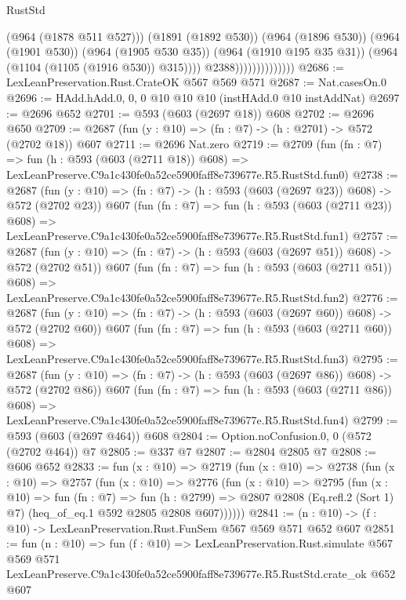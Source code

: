 \begin{lexlean}{RustStd}
\begin{coremodule}
                                      (@964 (@1878 @511 @527)))
                                    (@1891 (@1892 @530))
                                    (@964 (@1896 @530))
                                    (@964 (@1901 @530))
                                    (@964 (@1905 @530 @35))
                                    (@964 (@1910 @195 @35 @31))
                                    (@964 (@1104 (@1105 (@1916 @530)) @315))))
                                @2388))))))))))))))
@2686 := LexLeanPreservation.Rust.CrateOK @567 @569 @571
@2687 := Nat.casesOn.{0}
@2696 := HAdd.hAdd.{0, 0, 0} @10 @10 @10 (instHAdd.{0} @10 instAddNat)
@2697 := @2696 @652
@2701 := @593 (@603 (@2697 @18)) @608
@2702 := @2696 @650
@2709 := @2687 (fun (y : @10) => (fn : @7) -> (h : @2701) -> @572 (@2702 @18)) @607
@2711 := @2696 Nat.zero
@2719 := @2709
    (fun (fn : @7) =>
    fun (h : @593 (@603 (@2711 @18)) @608) =>
    LexLeanPreserve.C9a1c430fe0a52ce5900faff8e739677e.R5.RustStd.fun0)
@2738 := @2687
    (fun (y : @10) => (fn : @7) -> (h : @593 (@603 (@2697 @23)) @608) -> @572 (@2702 @23))
    @607
    (fun (fn : @7) =>
    fun (h : @593 (@603 (@2711 @23)) @608) =>
    LexLeanPreserve.C9a1c430fe0a52ce5900faff8e739677e.R5.RustStd.fun1)
@2757 := @2687
    (fun (y : @10) => (fn : @7) -> (h : @593 (@603 (@2697 @51)) @608) -> @572 (@2702 @51))
    @607
    (fun (fn : @7) =>
    fun (h : @593 (@603 (@2711 @51)) @608) =>
    LexLeanPreserve.C9a1c430fe0a52ce5900faff8e739677e.R5.RustStd.fun2)
@2776 := @2687
    (fun (y : @10) => (fn : @7) -> (h : @593 (@603 (@2697 @60)) @608) -> @572 (@2702 @60))
    @607
    (fun (fn : @7) =>
    fun (h : @593 (@603 (@2711 @60)) @608) =>
    LexLeanPreserve.C9a1c430fe0a52ce5900faff8e739677e.R5.RustStd.fun3)
@2795 := @2687
    (fun (y : @10) => (fn : @7) -> (h : @593 (@603 (@2697 @86)) @608) -> @572 (@2702 @86))
    @607
    (fun (fn : @7) =>
    fun (h : @593 (@603 (@2711 @86)) @608) =>
    LexLeanPreserve.C9a1c430fe0a52ce5900faff8e739677e.R5.RustStd.fun4)
@2799 := @593 (@603 (@2697 @464)) @608
@2804 := Option.noConfusion.{0, 0} (@572 (@2702 @464)) @7
@2805 := @337 @7
@2807 := @2804 @2805 @7
@2808 := @606 @652
@2833 := fun (x : @10) =>
  @2719
    (fun (x : @10) =>
    @2738
      (fun (x : @10) =>
      @2757
        (fun (x : @10) =>
        @2776
          (fun (x : @10) =>
          @2795
            (fun (x : @10) =>
            fun (fn : @7) =>
            fun (h : @2799) =>
            @2807 @2808 (Eq.refl.{2} (Sort 1) @7) (heq_of_eq.{1} @592 @2805 @2808 @607))))))
@2841 := (n : @10) -> (f : @10) -> LexLeanPreservation.Rust.FunSem @567 @569 @571 @652 @607
@2851 := fun (n : @10) =>
  fun (f : @10) =>
  LexLeanPreservation.Rust.simulate
    @567
    @569
    @571
    LexLeanPreserve.C9a1c430fe0a52ce5900faff8e739677e.R5.RustStd.crate_ok
    @652
    @607
\end{coremodule}
\end{lexlean}
